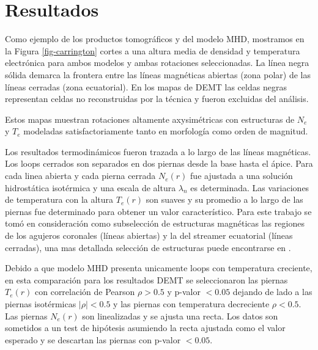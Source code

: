 \documentclass[baaa]{baaa}
\begin{document}


\section{Resultados}
Como ejemplo de los productos tomográficos y del modelo MHD, mostramos en la Figura \ref{fig-carrington} cortes a una altura media de densidad y temperatura electrónica para ambos modelos y ambas rotaciones seleccionadas. La línea negra sólida demarca la frontera entre las líneas magnéticas abiertas (zona polar) de las líneas cerradas (zona ecuatorial). En los mapas de DEMT las celdas negras representan celdas no reconstruidas por la técnica y fueron excluidas del análisis.

Estos mapas muestran rotaciones altamente axysimétricas con estructuras de $N_e$ y $T_e$ modeladas satisfactoriamente tanto en morfología como orden de magnitud.

Los resultados termodinámicos fueron trazada a lo largo de las líneas magnéticas. Los loops cerrados son separados en dos piernas desde la base hasta el ápice. Para cada linea abierta y cada pierna cerrada $N_e(r)$ fue ajustada a una solución hidrostática isotérmica y una escala de altura $\lambda_n$ es determinada. Las variaciones de temperatura con la altura $T_e(r)$ son suaves y su promedio a lo largo de las piernas fue determinado para obtener un valor característico. Para este trabajo se tomó en consideración como subselección de estructuras magnéticas las regiones de los agujeros coronales (líneas abiertas) y la del streamer ecuatorial (líneas cerradas), una mas detallada selección de estructuras puede encontrarse en \citet{lloveras_2017}. 

Debido a que modelo MHD presenta unicamente loops con temperatura creciente, en esta comparación para los resultados DEMT se seleccionaron las piernas $T_e(r)$ con correlación de Pearson $\rho > 0.5$ y p-valor $< 0.05$ dejando de lado a las piernas isotérmicas $\left | \rho \right | < 0.5$ y las piernas con temperatura decreciente $\rho < 0.5$. Las piernas $N_e(r)$ son linealizadas y se ajusta una recta. Los datos son sometidos a un test de hipótesis asumiendo la recta ajustada como el valor esperado y se descartan las piernas con p-valor $<0.05$.
\end{document}

